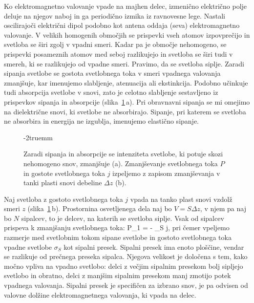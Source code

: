 Ko elektromagnetno valovanje vpade na majhen delec, izmenično električno 
polje deluje na njegov naboj in ga periodično izmika iz ravnovesne lege. 
Nastali oscilirajoči električni dipol 
podobno kot antena oddaja (seva) elektromagnetno valovanje. V velikih 
homogenih območjih se prispevki vseh atomov izpovprečijo in svetloba
se širi zgolj v vpadni smeri. Kadar pa je območje nehomogeno, se 
prispevki posameznih atomov med seboj razlikujejo in svetloba se širi 
tudi v smereh, ki se razlikujejo od vpadne smeri. Pravimo, da se svetloba siplje. 
Zaradi sipanja svetlobe se gostota svetlobnega toka v smeri vpadnega valovanja
zmanjšuje, kar imenujemo slabljenje, atenuacija ali ekstinkcija. Podobno učinkuje tudi 
absorpcija svetlobe v snovi, zato je celotno slabljenje sestavljeno iz 
prispevkov sipanja in absorpcije (slika~\ref{fig:07_skica}\,a). Pri obravnavni sipanja se mi omejimo na 
dielektrične snovi, ki svetlobe ne absorbirajo. Sipanje, pri katerem se 
svetloba ne absorbira in energija ne izgublja, imenujemo elastično sipanje.

\begin{figure}[!h]
\centering
\def\svgwidth{100truemm} 

\caption{Zaradi sipanja in absorpcije se intenziteta svetlobe, ki potuje skozi 
nehomogeno snov, zmanjšuje (a). Zmanjševanje svetlobnega toka $P$ in 
gostote svetlobnega toka $j$ izpeljemo z zapisom
zmanjševanja v tanki plasti snovi debeline $\Delta z$ (b).}
\label{fig:07_skica}
\vglue-2truemm
\end{figure}

Naj svetloba z gostoto svetlobnega toka $j$ vpada na tanko plast snovi 
vzdolž smeri $z$ (slika~\ref{fig:07_skica}\,b). Prostornina osvetljenega 
dela naj bo $V = S \Delta z$,
v njem pa naj bo $N$ sipalcev, to je delcev, na katerih se svetloba siplje. 
Vsak od sipalcev prispeva k zmanjšanju svetlobnega toka:
\beq
\Delta P_1 = - \sigma_S j,
\label{eq:07_01}
\eeq
pri čemer vpeljemo razmerje med svetlobnim tokom sipane svetlobe 
in gostoto svetlobnega toka vpadne svetlobe $\sigma_S$ kot sipalni presek. 
Sipalni presek ima
enoto ploščine, vendar se razlikuje od prečnega preseka sipalca.
Njegova velikost je določena s tem, kako močno vpliva na vpadno 
svetlobo: delci z večjim sipalnim presekom bolj sipljejo svetlobo in obratno, 
delci z manjšim sipalnim presekom manj zmotijo potek vpadnega valovanja. 
Sipalni presek je specifičen za izbrano snov, je pa odvisen od valovne 
dolžine elektromagnetnega valovanja, ki vpada na delec. 

